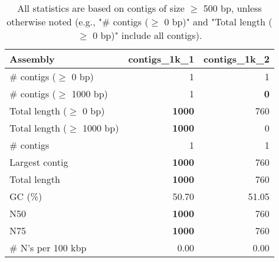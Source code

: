 \documentclass[12pt,a4paper]{article}
\begin{document}
\begin{table}[ht]
\begin{center}
\caption{All statistics are based on contigs of size $\geq$ 500 bp, unless otherwise noted (e.g., "\# contigs ($\geq$ 0 bp)" and "Total length ($\geq$ 0 bp)" include all contigs).}
\begin{tabular}{|l*{2}{|r}|}
\hline
Assembly & contigs\_1k\_1 & contigs\_1k\_2 \\ \hline
\# contigs ($\geq$ 0 bp) & 1 & 1 \\ \hline
\# contigs ($\geq$ 1000 bp) & 1 & {\bf 0} \\ \hline
Total length ($\geq$ 0 bp) & {\bf 1000} & 760 \\ \hline
Total length ($\geq$ 1000 bp) & {\bf 1000} & 0 \\ \hline
\# contigs & 1 & 1 \\ \hline
Largest contig & {\bf 1000} & 760 \\ \hline
Total length & {\bf 1000} & 760 \\ \hline
GC (\%) & 50.70 & 51.05 \\ \hline
N50 & {\bf 1000} & 760 \\ \hline
N75 & {\bf 1000} & 760 \\ \hline
\# N's per 100 kbp & 0.00 & 0.00 \\ \hline
\end{tabular}
\end{center}
\end{table}
\end{document}
